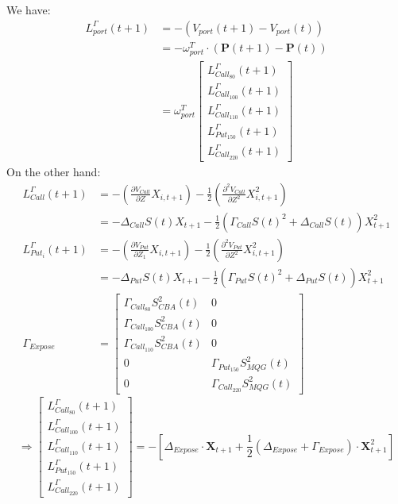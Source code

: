 We have:
\begin{align*}
    L_{port}^\Gamma(t+1)&=-(V_{port}(t+1)-V_{port}(t)) \\
    &=-\omega_{port}^T\cdot(\mathbf{P}(t+1)-\mathbf{P}(t))\\
    &=\omega_{port}^T\begin{bmatrix}L_{Call_{80}}^\Gamma(t+1) \\  L_{Call_{100}}^\Gamma(t+1)\\ L_{Call_{110}}^\Gamma(t+1) \\ L_{Put_{150}}^\Gamma(t+1) \\  L_{Call_{220}}^\Gamma(t+1)\end{bmatrix}
\end{align*}
On the other hand:
\begin{align*}
    L_{Call}^\Gamma(t+1)&=-(\frac{\partial V_{Call}}{\partial Z}X_{i,t+1})-\frac{1}{2}(\frac{\partial^2 V_{Call}}{\partial Z^2}X_{i,t+1}^2) \\
    &=-\Delta_{Call} S(t) X_{t+1}-\frac{1}{2}(\Gamma_{Call}S(t)^2+\Delta_{Call} S(t)) X_{t+1}^2\\
    L_{Put_i}^\Gamma(t+1)&=-(\frac{\partial V_{Put}}{\partial Z_1}X_{i,t+1})-\frac{1}{2}(\frac{\partial^2 V_{Put}}{\partial Z^2}X_{i,t+1}^2) \\
    &=-\Delta_{Put} S(t) X_{t+1}-\frac{1}{2}(\Gamma_{Put}S(t)^2+\Delta_{Put} S(t)) X_{t+1}^2\\
    \Gamma_{Expose}&=\begin{bmatrix}
        \Gamma_{Call_{80}}S_{CBA}^2(t)& 0\\
        \Gamma_{Call_{100}}S_{CBA}^2(t)& 0\\
        \Gamma_{Call_{110}}S_{CBA}^2(t)& 0\\
        0 & \Gamma_{Put_{150}}S_{MQG}^2(t)\\
       0 & \Gamma_{Call_{220}}S_{MQG}^2(t)
    \end{bmatrix}
\end{align*}
\[
    \Longrightarrow \begin{bmatrix}L_{Call_{80}}^\Gamma(t+1) \\  L_{Call_{100}}^\Gamma(t+1)\\ L_{Call_{110}}^\Gamma(t+1) \\ L_{Put_{150}}^\Gamma(t+1) \\  L_{Call_{220}}^\Gamma(t+1)\end{bmatrix}=-\left[\Delta_{Expose}\cdot \mathbf{X}_{t+1}+\frac{1}{2}\left(\Delta_{Expose}+\Gamma_{Expose}\right)\cdot\mathbf{X}_{t+1}^2\right]
\]
